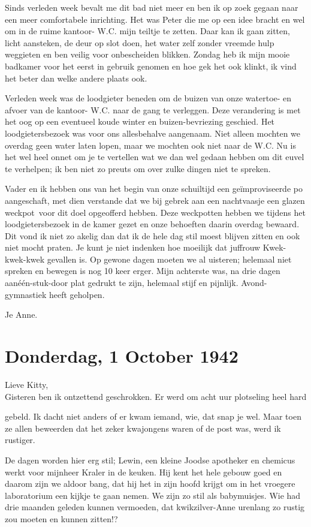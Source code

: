 \documentclass{book}
\begin{document}
Sinds verleden week bevalt me dit bad niet meer en ben ik op zoek gegaan
naar een meer comfortabele inrichting. Het was Peter die me op een idee
bracht en wel om in de ruime kantoor- W.C. mijn teiltje te zetten. Daar
kan ik gaan zitten, licht aansteken, de deur op slot doen, het water
zelf zonder vreemde hulp weggieten en ben veilig voor onbescheiden
blikken. Zondag heb ik mijn mooie badkamer voor het eerst in gebruik
genomen en hoe gek het ook klinkt, ik vind het beter dan welke andere
plaats ook.

Verleden week was de loodgieter beneden om de buizen van onze watertoe-
en afvoer van de kantoor- W.C. naar de gang te verleggen. Deze
verandering is met het oog op een eventueel koude winter en
buizen-bevriezing geschied. Het loodgietersbezoek was voor ons
allesbehalve aangenaam. Niet alleen mochten we overdag geen water laten
lopen, maar we mochten ook niet naar de W.C. Nu is het wel heel onnet om
je te vertellen wat we dan wel gedaan hebben om dit euvel te verhelpen;
ik ben niet zo preuts om over zulke dingen niet te spreken.

Vader en ik hebben ons van het begin van onze schuiltijd een
geïmproviseerde po aangeschaft, met dien verstande dat we bij gebrek aan
een nachtvaasje een glazen weckpot~voor dit doel opgeofferd hebben. Deze
weckpotten hebben we tijdens het loodgietersbezoek in de kamer gezet en
onze behoeften daarin overdag bewaard. Dit vond ik niet zo akelig dan
dat ik de hele dag stil moest blijven zitten en ook niet mocht praten.
Je kunt je niet indenken hoe moeilijk dat juffrouw Kwek-kwek-kwek
gevallen is. Op gewone dagen moeten we al uisteren; helemaal niet
spreken en bewegen is nog 10 keer erger. Mijn achterste was, na drie
dagen aanéén-stuk-door plat gedrukt te zijn, helemaal stijf en pijnlijk.
Avond-gymnastiek heeft geholpen.

Je Anne.

\chapter{Donderdag, 1 October 1942}

Lieve Kitty,\\Gisteren ben ik ontzettend geschrokken. Er werd om acht
uur plotseling heel hard

gebeld. Ik dacht niet anders of er kwam iemand, wie, dat snap je wel.
Maar toen ze allen beweerden dat het zeker kwajongens waren of de post
was, werd ik rustiger.

De dagen worden hier erg stil; Lewin, een kleine Joodse apotheker en
chemicus werkt voor mijnheer Kraler in de keuken. Hij kent het hele
gebouw goed en daarom zijn we aldoor bang, dat hij het in zijn hoofd
krijgt om in het vroegere laboratorium een kijkje te gaan nemen. We zijn
zo stil als babymuisjes. Wie had drie maanden geleden kunnen vermoeden,
dat kwikzilver-Anne urenlang zo rustig zou moeten en kunnen zitten!?
\end{document}
